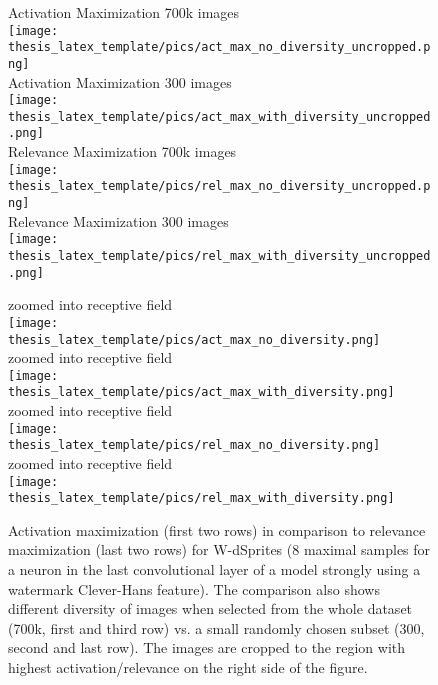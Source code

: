 \begin{figure}[t!]
\centering
\begin{minipage}{0.49\textwidth}
    Activation Maximization 700k images \\
	\texttt{[image: thesis\_latex\_template/pics/act\_max\_no\_diversity\_uncropped.png]}\\
    Activation Maximization 300 images \\
	\texttt{[image: thesis\_latex\_template/pics/act\_max\_with\_diversity\_uncropped.png]}\\
    Relevance Maximization 700k images\\
	\texttt{[image: thesis\_latex\_template/pics/rel\_max\_no\_diversity\_uncropped.png]}\\
    Relevance Maximization 300 images \\
	\texttt{[image: thesis\_latex\_template/pics/rel\_max\_with\_diversity\_uncropped.png]}
\end{minipage}
\begin{minipage}{0.49\textwidth}
    zoomed into receptive field \\
	\texttt{[image: thesis\_latex\_template/pics/act\_max\_no\_diversity.png]}\\
    zoomed into receptive field \\
	\texttt{[image: thesis\_latex\_template/pics/act\_max\_with\_diversity.png]}\\
    zoomed into receptive field \\
	\texttt{[image: thesis\_latex\_template/pics/rel\_max\_no\_diversity.png]}\\
    zoomed into receptive field \\
	\texttt{[image: thesis\_latex\_template/pics/rel\_max\_with\_diversity.png]}
\end{minipage}
\caption[Activation and Relevance Maximization]{Activation maximization (first two rows) in comparison to relevance maximization (last two rows) for W-dSprites (8 maximal samples for a neuron in the last convolutional layer of a model strongly using a watermark Clever-Hans feature). The comparison also shows different diversity of images when selected from the whole dataset (700k, first and third row) vs. a small randomly chosen subset (300, second and last row). 
The images are cropped to the region with highest activation/relevance on the right side of the figure. }
\label{fig:act_rel_max}
\end{figure}


